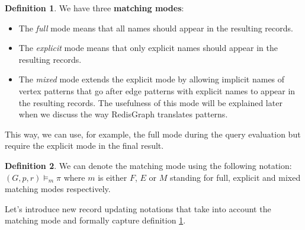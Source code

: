 \documentclass[14pt]{constructor-thesis}
\theoremstyle{definition}
\newtheorem{definition}{Definition}
\begin{document}
\begin{definition}
  \label{def:matching-modes}
  We have three \textbf{matching modes}:
  \begin{itemize}
    \item The \textit{full} mode means that all names should appear in the resulting records.
    \item The \textit{explicit} mode means that only explicit names should appear in the resulting records.
    \item The \textit{mixed} mode extends the explicit mode by allowing implicit names of vertex patterns that go after edge patterns with explicit names to appear in the resulting records. The usefulness of this mode will be explained later when we discuss the way RedisGraph translates patterns.
  \end{itemize} 
\end{definition}

This way, we can use, for example, the full mode during the query evaluation but require the explicit mode in the final result.

\begin{definition}
  We can denote the matching mode using the following notation:
  $ (G, p, r) \models_m \pi $
  where $m$ is either $F$, $E$ or $M$ standing for full, explicit and mixed matching modes respectively.
\end{definition}

Let's introduce new record updating notations that take into account the matching mode and formally capture definition \ref{def:matching-modes}.
\end{document}
